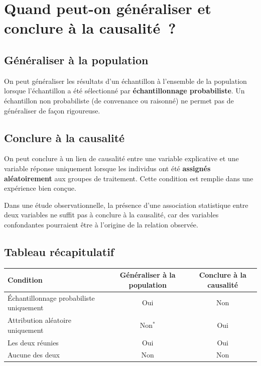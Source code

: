 \documentclass[11pt,french]{article}
\begin{document}
\section{Quand peut-on généraliser et conclure à la causalité~?}

\subsection{Généraliser à la population}

On peut généraliser les résultats d'un échantillon à l'ensemble de la population lorsque
l'échantillon a été sélectionné par \textbf{échantillonnage probabiliste}. Un échantillon non
probabiliste (de convenance ou raisonné) ne permet pas de généraliser de façon rigoureuse.

\subsection{Conclure à la causalité}

On peut conclure à un lien de causalité entre une variable explicative et une variable réponse
uniquement lorsque les individus ont été \textbf{assignés aléatoirement} aux groupes de
traitement. Cette condition est remplie dans une expérience bien conçue.

Dans une étude observationnelle, la présence d'une association statistique entre deux variables
ne suffit pas à conclure à la causalité, car des variables confondantes pourraient être à
l'origine de la relation observée.

\subsection{Tableau récapitulatif}

\begin{center}
\renewcommand{\arraystretch}{1.5}
\begin{tabular}{lcc}
\toprule
\textbf{Condition} & \textbf{Généraliser à la population} & \textbf{Conclure à la causalité} \\
\midrule
Échantillonnage probabiliste uniquement & Oui & Non \\
Attribution aléatoire uniquement        & Non$^{*}$ & Oui \\
Les deux réunies                        & Oui & Oui \\
Aucune des deux                         & Non & Non \\
\bottomrule
\end{tabular}
\end{center}
\end{document}
